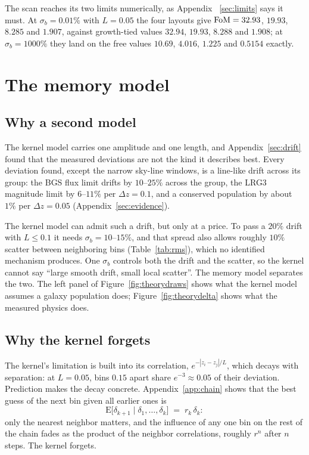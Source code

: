 \documentclass[11pt]{article}
\begin{document}
The scan reaches its two limits numerically, as Appendix~%
\ref{sec:limits} says it must.  At $\sigma_b = 0.01\%$ with
$L = 0.05$ the four layouts give ${\rm FoM} = 32.93$, $19.93$,
$8.285$ and $1.907$, against growth-tied values $32.94$, $19.93$,
$8.288$ and $1.908$; at $\sigma_b = 1000\%$ they land on the free
values $10.69$, $4.016$, $1.225$ and $0.5154$ exactly.

\section{The memory model}
\label{sec:memory}

\subsection{Why a second model}
\label{sec:memwhy}

The kernel model carries one amplitude and one length, and
Appendix~\ref{sec:drift} found that the measured deviations are not
the kind it describes best.  Every deviation found, except the narrow
sky-line windows, is a line-like drift across its group: the BGS flux
limit drifts by $10$--$25\%$ across the group, the LRG3 magnitude
limit by $6$--$11\%$ per $\Delta z = 0.1$, and a conserved population
by about $1\%$ per $\Delta z = 0.05$ (Appendix~\ref{sec:evidence}).

The kernel model can admit such a drift, but only at a price.  To
pass a $20\%$ drift with $L \leq 0.1$ it needs
$\sigma_b = 10$--$15\%$, and that spread also allows roughly $10\%$
scatter between neighboring bins (Table~\ref{tab:rms}), which no
identified mechanism produces.  One $\sigma_b$ controls both the
drift and the scatter, so the kernel cannot say ``large smooth
drift, small local scatter''.  The memory model separates the two.
The left panel of Figure~\ref{fig:theorydraws} shows what the kernel
model assumes a galaxy population does; Figure~\ref{fig:theorydelta}
shows what the measured physics does.

\subsection{Why the kernel forgets}
\label{sec:memforget}

The kernel's limitation is built into its correlation,
$e^{-|z_i - z_j|/L}$, which decays with separation: at $L = 0.05$,
bins $0.15$ apart share $e^{-3} \approx 0.05$ of their deviation.
Prediction makes the decay concrete.  Appendix~\ref{app:chain} shows
that the best guess of the next bin given all earlier ones is
\begin{equation}
  \mathrm{E}\bigl[\delta_{k+1} \mid \delta_1, \dots, \delta_k\bigr]
  \;=\; r_k\, \delta_k :
  \label{eq:memmarkov}
\end{equation}
only the nearest neighbor matters, and the influence of any one bin
on the rest of the chain fades as the product of the neighbor
correlations, roughly $r^n$ after $n$ steps.  The kernel forgets.
\end{document}
